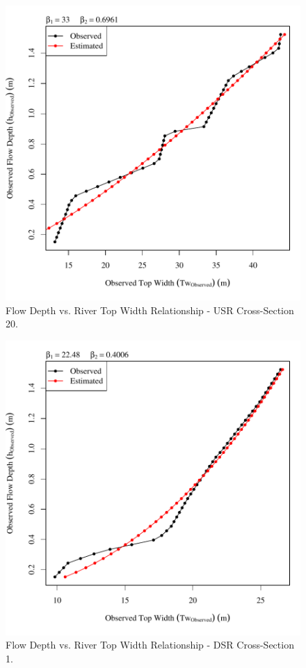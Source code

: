 \begin{center}
\begin{figure}[htbp]
	\includegraphics[width=6in]{"Figures/Results_USR/Survey Tw vs H-Section 20"}
	\caption{Flow Depth vs. River Top Width Relationship - USR Cross-Section 20.}
\end{figure}
\end{center}
\newpage

\begin{center}
\begin{figure}[htbp]
	\includegraphics[width=6in]{"Figures/Results_DSR/Survey Tw vs H-Section 1"}
	\caption{Flow Depth vs. River Top Width Relationship - DSR Cross-Section 1.}
\end{figure}
\end{center}
\newpage

